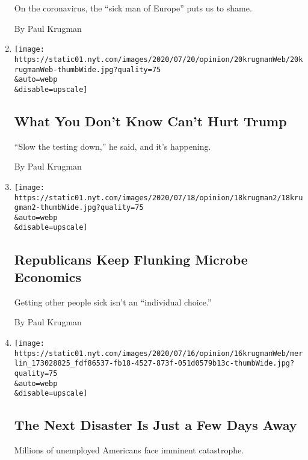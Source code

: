 \begin{enumerate}
  On the coronavirus, the ``sick man of Europe'' puts us to shame.

  By Paul Krugman
\item
  \href{/2020/07/20/opinion/trump-coronavirus-testing.html}{}

  \texttt{[image: https://static01.nyt.com/images/2020/07/20/opinion/20krugmanWeb/20krugmanWeb-thumbWide.jpg?quality=75\\\&auto=webp\\\&disable=upscale]}

  \hypertarget{what-you-dont-know-cant-hurt-trump}{%
  \subsection{What You Don't Know Can't Hurt
  Trump}\label{what-you-dont-know-cant-hurt-trump}}

  ``Slow the testing down,'' he said, and it's happening.

  By Paul Krugman
\item
  \href{/2020/07/18/opinion/republicans-keep-flunking-microbe-economics.html}{}

  \texttt{[image: https://static01.nyt.com/images/2020/07/18/opinion/18krugman2/18krugman2-thumbWide.jpg?quality=75\\\&auto=webp\\\&disable=upscale]}

  \hypertarget{republicans-keep-flunking-microbe-economics}{%
  \subsection{Republicans Keep Flunking Microbe
  Economics}\label{republicans-keep-flunking-microbe-economics}}

  Getting other people sick isn't an ``individual choice.''

  By Paul Krugman
\item
  \href{/2020/07/16/opinion/coronavirus-economy-unemployment.html}{}

  \texttt{[image: https://static01.nyt.com/images/2020/07/16/opinion/16krugmanWeb/merlin\_173028825\_fdf86537-fb18-4527-873f-051d0579b13c-thumbWide.jpg?quality=75\\\&auto=webp\\\&disable=upscale]}

  \hypertarget{the-next-disaster-is-just-a-few-days-away}{%
  \subsection{The Next Disaster Is Just a Few Days
  Away}\label{the-next-disaster-is-just-a-few-days-away}}

  Millions of unemployed Americans face imminent catastrophe.


\end{enumerate}
